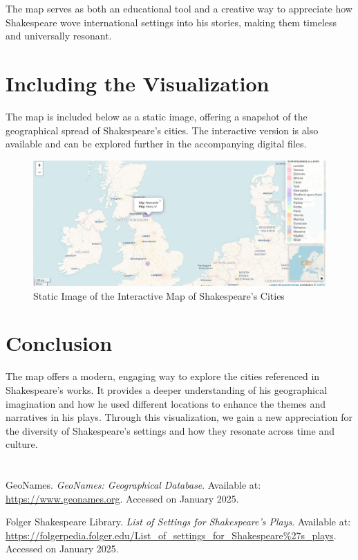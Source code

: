 \documentclass[a4paper,12pt]{article}
\begin{document}
The map serves as both an educational tool and a creative way to appreciate how Shakespeare wove international settings into his stories, making them timeless and universally resonant.

\section*{\color{shakespeareblue}Including the Visualization}
The map is included below as a static image, offering a snapshot of the geographical spread of Shakespeare’s cities. The interactive version is also available and can be explored further in the accompanying digital files.

\begin{figure}[ht]
    \centering
    \includegraphics[width=0.8\linewidth]{MapPopUps.png} %
    \caption{Static Image of the Interactive Map of Shakespeare's Cities}
    \label{fig:map}
\end{figure}


\section*{\color{shakespeareblue}Conclusion}
The map offers a modern, engaging way to explore the cities referenced in Shakespeare's works. It provides a deeper understanding of his geographical imagination and how he used different locations to enhance the themes and narratives in his plays. Through this visualization, we gain a new appreciation for the diversity of Shakespeare's settings and how they resonate across time and culture.

\newpage
\section*{\color{shakespeareblue}}

\sloppy
\begin{thebibliography}{99}
\raggedright
{}
GeoNames. \textit{GeoNames: Geographical Database}. Available at: \url{https://www.geonames.org}. Accessed on January 2025.

Folger Shakespeare Library. \textit{List of Settings for Shakespeare's Plays}. Available at: \url{https://folgerpedia.folger.edu/List_of_settings_for_Shakespeare%27s_plays}. Accessed on January 2025.
\end{thebibliography}
\end{document}
